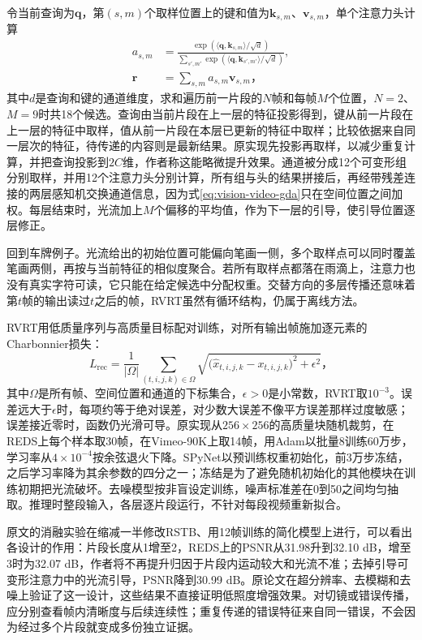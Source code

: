 令当前查询为$\bm{q}$，第$(s,m)$个取样位置上的键和值为$\bm{k}_{s,m}$、$\bm{v}_{s,m}$，单个注意力头计算
\begin{equation}
  \begin{aligned}
    a_{s,m}&=
      \frac{\exp(\langle\bm{q},\bm{k}_{s,m}\rangle/\sqrt d)}
      {\sum_{s',m'}\exp(\langle\bm{q},\bm{k}_{s',m'}\rangle/\sqrt d)},\\
    \bm{r}&=\sum_{s,m}a_{s,m}\bm{v}_{s,m}\text{，}
  \end{aligned}
  \label{eq:vision-video-gda}
\end{equation}
其中$d$是查询和键的通道维度，求和遍历前一片段的$N$帧和每帧$M$个位置，$N=2$、$M=9$时共18个候选。查询由当前片段在上一层的特征投影得到，键从前一片段在上一层的特征中取样，值从前一片段在本层已更新的特征中取样；比较依据来自同一层次的特征，待传递的内容则是最新结果。原实现先投影再取样，以减少重复计算，并把查询投影到$2C$维，作者称这能略微提升效果。通道被分成12个可变形组分别取样，并用12个注意力头分别计算，所有组与头的结果拼接后，再经带残差连接的两层感知机交换通道信息，因为式\eqref{eq:vision-video-gda}只在空间位置之间加权。每层结束时，光流加上$M$个偏移的平均值，作为下一层的引导，使引导位置逐层修正。

回到车牌例子。光流给出的初始位置可能偏向笔画一侧，多个取样点可以同时覆盖笔画两侧，再按与当前特征的相似度聚合。若所有取样点都落在雨滴上，注意力也没有真实字符可读，它只能在给定候选中分配权重。交替方向的多层传播还意味着第$t$帧的输出读过$t$之后的帧，RVRT虽然有循环结构，仍属于离线方法。

RVRT用低质量序列与高质量目标配对训练，对所有输出帧施加逐元素的Charbonnier损失：
\begin{equation}
  L_{\mathrm{rec}}=\frac{1}{|\Omega|}\sum_{(t,i,j,k)\in\Omega}
    \sqrt{\bigl(\widehat{x}_{t,i,j,k}-x_{t,i,j,k}\bigr)^2+\epsilon^2}\text{，}
  \label{eq:vision-video-charbonnier}
\end{equation}
其中$\Omega$是所有帧、空间位置和通道的下标集合，$\epsilon>0$是小常数，RVRT取$10^{-3}$。误差远大于$\epsilon$时，每项约等于绝对误差，对少数大误差不像平方误差那样过度敏感；误差接近零时，函数仍光滑可导。原实现从$256\times256$的高质量块随机裁剪，在REDS上每个样本取30帧，在Vimeo-90K上取14帧，用Adam以批量8训练60万步，学习率从$4\times10^{-4}$按余弦退火下降。SPyNet以预训练权重初始化，前3万步冻结，之后学习率降为其余参数的四分之一；冻结是为了避免随机初始化的其他模块在训练初期把光流破坏。去噪模型按非盲设定训练，噪声标准差在0到50之间均匀抽取。推理时整段输入，各层逐片段运行，不针对每段视频重新拟合。

原文的消融实验在缩减一半修改RSTB、用12帧训练的简化模型上进行，可以看出各设计的作用：片段长度从1增至2，REDS上的PSNR从31.98升到32.10 dB，增至3时为32.07 dB，作者将不再提升归因于片段内运动较大和光流不准；去掉引导可变形注意力中的光流引导，PSNR降到30.99 dB。原论文在超分辨率、去模糊和去噪上验证了这一设计，这些结果不直接证明低照度增强效果。对切镜或错误传播，应分别查看帧内清晰度与后续连续性；重复传递的错误特征来自同一错误，不会因为经过多个片段就变成多份独立证据。

